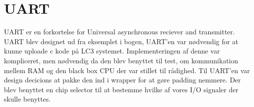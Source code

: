 \section{UART}
UART er en forkortelse for Universal asynchronous reciever and transmitter. UART blev designet ud fra eksemplet i bogen, UART'en var nødvendig for at kunne uploade c kode på LC3 systemet. Implementeringen af denne var kompliceret, men nødvendig da den blev benyttet til test, om kommunikation mellem RAM og den black box CPU der var stillet til rådighed. Til UART'en var design decicions at pakke den ind i wrapper for at gøre padding nemmere. Der blev benyttet en chip selector til at bestemme hvilke af vores I/O signaler der skulle benyttes.
